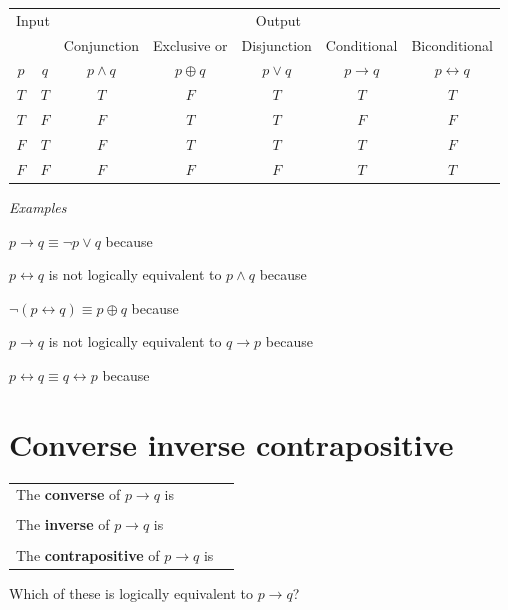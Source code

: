 \documentclass[12pt, oneside]{article}
\begin{document}
\begin{center}
    \begin{tabular}{cc||c|c|c|c|c}
    \multicolumn{2}{c||}{Input}  & \multicolumn{5}{c}{Output} \\
     & & Conjunction &  Exclusive or & Disjunction  &  Conditional & Biconditional  \\
    $p$ & $q$ & $p \wedge q$ &  $p  \oplus  q$ & $p \vee  q$ & $p \to q$ & $p \leftrightarrow q$\\
    \hline
    $T$ & $T$ & $T$ & $F$ & $T$ & $T$& $T$\\
    $T$ & $F$ & $F$ & $T$ & $T$ & $F$& $F$\\
    $F$ & $T$ & $F$ & $T$ & $T$ & $T$& $F$\\
    $F$ & $F$ & $F$ & $F$ & $F$ & $T$& $T$\\
    \end{tabular}
    \end{center}
    
    {\it Examples} 
    
    $p \to q \equiv \lnot p \lor q$ because \underline{\phantom{\hspace{4in}}} 
    
    \vfill
    
    $p \leftrightarrow q$ is not logically equivalent to $p \land q$ because \underline{\phantom{\hspace{4in}}} 
    
    \vfill
    
    $\lnot( p \leftrightarrow q) \equiv p \oplus q$ because \underline{\phantom{\hspace{4in}}} 
    
    \vfill
    
    
    $p \to q$ is not logically equivalent to $q \to p$ because \underline{\phantom{\hspace{4in}}} 
    
    \vfill
    
    $p \leftrightarrow q \equiv q \leftrightarrow p$ because \underline{\phantom{\hspace{4in}}} 
    
    \vfill \vfill
\section*{Converse inverse contrapositive}


\begin{tabular}{ll}
    The {\bf  converse}  of $p \to q$ is & \underline{\phantom{\hspace{1.6in}}}\\
    &  \\
    The {\bf  inverse}  of $p \to q$ is  &\underline{\phantom{\hspace{1.6in}}}\\
    &  \\
    The {\bf  contrapositive}  of $p \to q$ is & \underline{\phantom{\hspace{1.6in}}}
    \end{tabular}
    Which of these is logically equivalent to $p \to q$?
    
\end{document}
